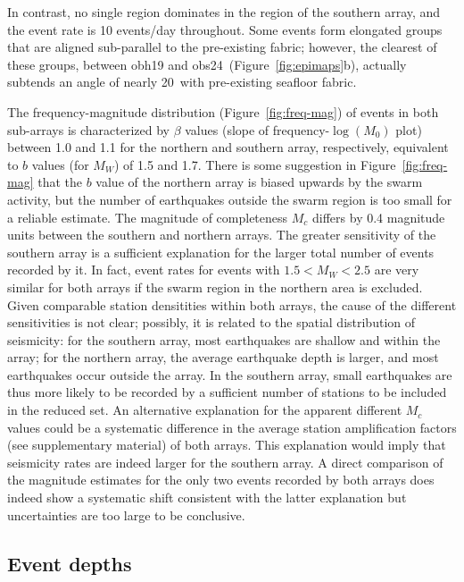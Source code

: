 \documentclass[reviewcopy]{elsarticle}
\begin{document}
In contrast, no single region dominates in the region of the southern
array, and the event rate is 10
events/day throughout.  Some events form elongated groups that are
aligned sub-parallel to the pre-existing fabric; however, the clearest
of these groups,
between obh19 and obs24~(Figure~\ref{fig:epimaps}b), actually subtends an angle
of nearly 20\dg\ with pre-existing seafloor fabric.

The frequency-magnitude distribution (Figure~\ref{fig:freq-mag}) of
events in both sub-arrays is
characterized by $\beta$ values (slope of frequency-$\log(M_0)$ plot) between 1.0 and 1.1 for the
northern and southern array, respectively,
equivalent to $b$ values (for $M_W$) of
1.5 and 1.7.
There is
some suggestion in Figure~\ref{fig:freq-mag} that the $b$ value of the northern array is biased upwards by
the swarm activity, but the number of earthquakes outside the swarm
region is too small for a reliable estimate.
The magnitude of completeness $M_c$ differs by 0.4 magnitude units between
the southern and northern arrays.
The greater sensitivity of the southern array
 is a sufficient  explanation for the larger total number of events
recorded by it.
  In fact, event rates for events with $1.5<M_W<2.5$
are very similar for both arrays if the swarm region in the northern area is
excluded.   Given comparable station densitities within both arrays,
the cause of the different sensitivities is not clear; possibly, it
is related to the spatial distribution of seismicity: for the
southern array, most earthquakes are shallow and within the array;
for the northern array, the average earthquake depth is larger, and
most earthquakes occur outside the array. In the southern array, small
earthquakes are thus more likely to be recorded by a sufficient number
of stations to be included in the reduced set.
An alternative explanation for the apparent different $M_c$ values
could be a systematic difference in the average station
amplification factors (see supplementary material) of both
arrays. This explanation would imply that seismicity rates are indeed
larger for the southern array.  A direct comparison of the magnitude
estimates for the only two events recorded by both arrays does indeed show
a systematic shift consistent with the latter explanation but
uncertainties are too large to be conclusive.

\subsection{Event depths}
\end{document}
